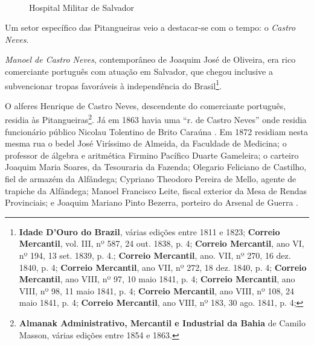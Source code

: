 \begin{figure}[!htp]
\centering
{}
\  %
\caption{Hospital Militar de Salvador}
\label{fig:hospmil}
\end{figure}

Um setor específico das Pitangueiras veio a destacar-se com o tempo: o \textit{Castro Neves}.

\textit{Manoel de Castro Neves}, contemporâneo de Joaquim José de Oliveira, era rico comerciante português com atuação em Salvador, que chegou inclusive a subvencionar tropas favoráveis à independência do Brasil\footnote{\textbf{Idade D'Ouro do Brazil}, várias edições entre 1811 e 1823; \textbf{Correio Mercantil}, vol. III, nº 587, 24 out. 1838, p. 4; \textbf{Correio Mercantil}, ano VI, nº 194, 13 set. 1839, p. 4.; \textbf{Correio Mercantil}, ano. VII, nº 270, 16 dez. 1840, p. 4; \textbf{Correio Mercantil}, ano VII, nº 272, 18 dez. 1840, p. 4; \textbf{Correio Mercantil}, ano VIII, nº 97, 10 maio 1841, p. 4; \textbf{Correio Mercantil}, ano VIII, nº 98, 11 maio 1841, p. 4;  \textbf{Correio Mercantil}, ano VIII, nº 108, 24 maio 1841, p. 4; \textbf{Correio Mercantil}, ano VIII, nº 183, 30 ago. 1841, p. 4;}. 

O alferes Henrique de Castro Neves, descendente do comerciante português, residia às Pitangueiras\footnote{\textbf{Almanak Administrativo, Mercantil e Industrial da Bahia} de Camilo Masson, várias edições entre 1854 e 1863.}. Já em 1863 havia uma ``r. de Castro Neves'' onde residia funcionário público Nicolau Tolentino de Brito Caraúna \cite[p.~125]{masson_almanak_1863}. Em 1872 residiam nesta mesma rua o bedel José Viríssimo de Almeida, da Faculdade de Medicina; o professor de álgebra e aritmética Firmino Pacífico Duarte Gameleira; o carteiro Joaquim Maria Soares, da Tesouraria da Fazenda; Olegario Feliciano de Castilho, fiel de armazém da Alfândega; Cypriano Theodoro Pereira de Mello, agente de trapiche da Alfândega; Manoel Francisco Leite, fiscal exterior da Mesa de Rendas Provinciais; e Joaquim Mariano Pinto Bezerra, porteiro do Arsenal de Guerra \cite[pp.~94, 96, 167, 170, 184, 194]{pimenta_almanak_1873}. 

